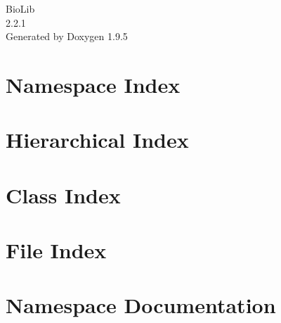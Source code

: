 \documentclass[twoside]{book}
\newcommand{\+}{\discretionary{\mbox{\scriptsize$\hookleftarrow$}}{}{}}
\newcommand{\clearemptydoublepage}{%
    \newpage{\pagestyle{empty}\cleardoublepage}%
  }
\begin{document}
  \raggedbottom
    \hypersetup{pageanchor=false,
                bookmarksnumbered=true,
                pdfencoding=unicode
               }
  \begin{titlepage}
  \vspace*{7cm}
  \begin{center}%
  {\Large Bio\+Lib}\\
  [1ex]\large 2.\+2.\+1 \\
  \vspace*{1cm}
  {\large Generated by Doxygen 1.9.5}\\
  \end{center}
  \end{titlepage}
  \clearemptydoublepage
  \tableofcontents
  \clearemptydoublepage
  \hypersetup{pageanchor=true}
\chapter{Namespace Index}

\chapter{Hierarchical Index}

\chapter{Class Index}

\chapter{File Index}

\chapter{Namespace Documentation}



\end{document}
